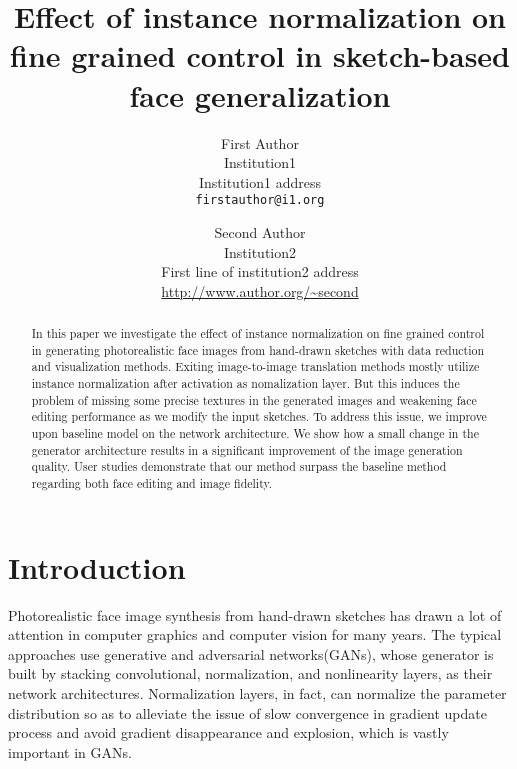 \documentclass[10pt,twocolumn,letterpaper]{article}
\begin{document}
\title{Effect of instance normalization on fine grained control in sketch-based face generalization}

\author{First Author\\
Institution1\\
Institution1 address\\
{\tt\small firstauthor@i1.org}
\and
Second Author\\
Institution2\\
First line of institution2 address\\
{\small\url{http://www.author.org/~second}}
}

\maketitle

\begin{abstract}
    In this paper we investigate the effect of instance normalization on fine grained control in generating photorealistic face images from hand-drawn sketches with data reduction and visualization methods. Exiting image-to-image translation methods mostly utilize instance normalization after activation as nomalization layer.
    But this induces the problem of missing some precise textures in the generated images and weakening face editing performance as we modify the input sketches. To address this issue, we improve upon baseline model on the network architecture. We show how a small change in the generator architecture results in a significant improvement of the image generation quality.  
    User studies demonstrate that our method surpass the baseline method regarding both face editing and image fidelity.
    
\end{abstract}

\section{Introduction}
Photorealistic face image synthesis from hand-drawn sketches has drawn a lot of attention in computer graphics and computer vision for many years. The typical approaches use generative and adversarial networks(GANs)\cite{gan}, whose generator is built by stacking convolutional, normalization, and nonlinearity layers, as their network architectures. Normalization layers, in fact, can normalize the parameter distribution so as to alleviate the issue of slow convergence in gradient update process and avoid gradient disappearance and explosion, which is vastly important in GANs.
\end{document}
